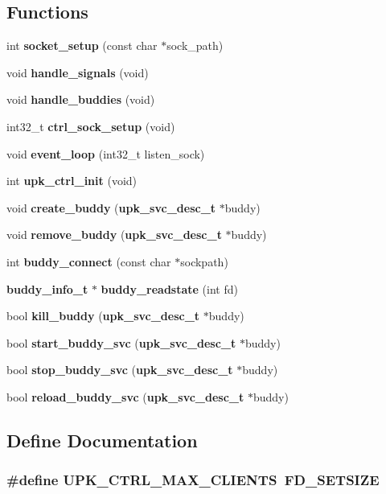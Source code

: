 \subsection*{Functions}
\begin{DoxyCompactItemize}
\item 
int {\bf socket\_\-setup} (const char $\ast$sock\_\-path)
\item 
void {\bf handle\_\-signals} (void)
\item 
void {\bf handle\_\-buddies} (void)
\item 
int32\_\-t {\bf ctrl\_\-sock\_\-setup} (void)
\item 
void {\bf event\_\-loop} (int32\_\-t listen\_\-sock)
\item 
int {\bf upk\_\-ctrl\_\-init} (void)
\item 
void {\bf create\_\-buddy} ({\bf upk\_\-svc\_\-desc\_\-t} $\ast$buddy)
\item 
void {\bf remove\_\-buddy} ({\bf upk\_\-svc\_\-desc\_\-t} $\ast$buddy)
\item 
int {\bf buddy\_\-connect} (const char $\ast$sockpath)
\item 
{\bf buddy\_\-info\_\-t} $\ast$ {\bf buddy\_\-readstate} (int fd)
\item 
bool {\bf kill\_\-buddy} ({\bf upk\_\-svc\_\-desc\_\-t} $\ast$buddy)
\item 
bool {\bf start\_\-buddy\_\-svc} ({\bf upk\_\-svc\_\-desc\_\-t} $\ast$buddy)
\item 
bool {\bf stop\_\-buddy\_\-svc} ({\bf upk\_\-svc\_\-desc\_\-t} $\ast$buddy)
\item 
bool {\bf reload\_\-buddy\_\-svc} ({\bf upk\_\-svc\_\-desc\_\-t} $\ast$buddy)
\end{DoxyCompactItemize}


\subsection{Define Documentation}
\subsubsection[{UPK\_\-CTRL\_\-MAX\_\-CLIENTS}]{\setlength{\rightskip}{0pt plus 5cm}\#define UPK\_\-CTRL\_\-MAX\_\-CLIENTS~FD\_\-SETSIZE}\label{controller_8h_a0b5b90624855687b6a19e350ff11bf83}


